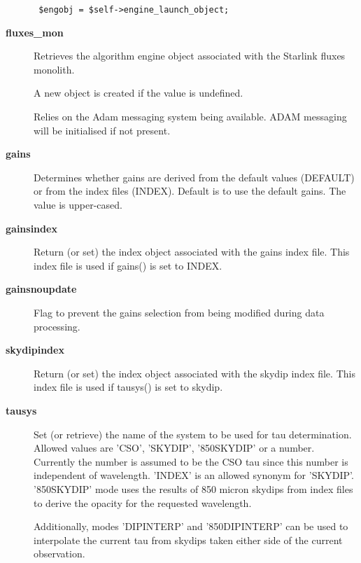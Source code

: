\begin{description}
\begin{verbatim}
 $engobj = $self->engine_launch_object;
\end{verbatim}
\item[\textbf{fluxes\_mon}] \mbox{}

Retrieves the algorithm engine object associated with
the Starlink fluxes monolith.



A new object is created if the value is undefined.



Relies on the Adam messaging system being available.
ADAM messaging will be initialised if not present.

\item[\textbf{gains}] \mbox{}

Determines whether gains are derived from the default values
(DEFAULT) or from the index files (INDEX). Default is to
use the default gains. The value is upper-cased.

\item[\textbf{gainsindex}] \mbox{}

Return (or set) the index object associated with the gains
index file. This index file is used if gains() is set to INDEX.

\item[\textbf{gainsnoupdate}] \mbox{}

Flag to prevent the gains selection from being modified during data
processing.

\item[\textbf{skydipindex}] \mbox{}

Return (or set) the index object associated with the skydip
index file. This index file is used if tausys() is set to skydip.

\item[\textbf{tausys}] \mbox{}

Set (or retrieve) the name of the system to be used for
tau determination. Allowed values are 'CSO', 'SKYDIP',
'850SKYDIP' or a number. Currently the number is assumed to be the 
CSO tau since this number is independent of wavelength.
'INDEX' is an allowed synonym for 'SKYDIP'. '850SKYDIP'
mode uses the results of 850 micron skydips from index
files to derive the opacity for the requested wavelength.



Additionally, modes 'DIPINTERP' and '850DIPINTERP' can be 
used to interpolate the current tau from skydips taken
either side of the current observation.




\end{description}
